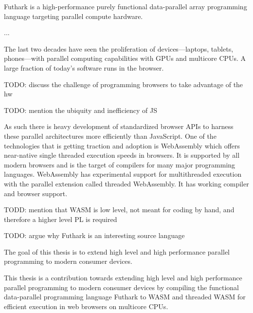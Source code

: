 \documentclass[11pt]{book}
\begin{document}
Futhark is a high-performance purely functional data-parallel array programming language targeting parallel compute hardware.

...


The last two decades have seen the proliferation of devices---laptops, tablets, phones---with parallel computing capabilities with GPUs and multicore CPUs.
A large fraction of today's software runs in the browser.


TODO: discuss the challenge of programming browsers to take advantage of the hw

TODO: mention the ubiquity and inefficiency of JS

As such there is heavy development of standardized browser APIs to harness these parallel architectures more efficiently than JavaScript. One of the technologies that is getting traction and adoption is WebAssembly which offers near-native single threaded execution speeds in browsers. It is supported by all modern browsers and is the target of compilers for many major programming languages. WebAssembly has experimental support for multithreaded execution with the parallel extension called threaded WebAssembly. It has working compiler and browser support.

TODD: mention that WASM is low level, not meant for coding by hand, and therefore a higher level PL is required

TODO: argue why Futhark is an interesting source language


The goal of this thesis is to extend high level and high performance parallel programming to modern consumer devices.


This thesis is a contribution towards extending high level and high performance parallel programming to modern consumer devices by compiling the functional data-parallel programming language Futhark to WASM and threaded WASM for efficient execution in web browsers on multicore CPUs.
\end{document}

